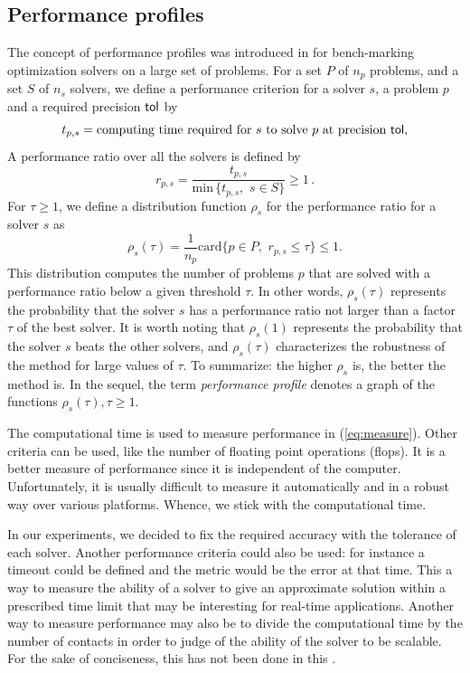 \subsection{Performance profiles}

The concept of performance profiles was introduced in \citep{Dolan.More_MP2002} for bench-marking optimization solvers on a large set of problems. For a set $P$ of $n_p$ problems, and a set $S$ of $n_s$ solvers, we define a performance criterion for a solver $s$, a problem $p$ and a required precision $\sf tol$ by
\begin{equation}
  \label{eq:measure}
 t_{p,s} = \text{computing time required for}\, \,  s\, \,  \text{to solve}\, \,  p \, \,  \text{at precision } \sf tol, 
\end{equation}
A performance ratio over all the solvers is defined by
\begin{equation}
 r_{p, s} = \frac{t_{p,s}}{\text{min}\, \{t_{p,s}, \, \, s \in S\}} \geq 1 \, .
\end{equation}
For $\tau \geq 1$, we define a  distribution function $\rho_s$ for the performance ratio for a solver $s$ as
\begin{equation}
 \rho_s(\tau) = \frac{1}{n_p} \text{card} \{p \in P, \, \, r_{p, s} \leq \tau\} \leq 1.
\end{equation}
This distribution computes the number of problems $p$ that are solved with a performance ratio below a given threshold $\tau$. In other words, $\rho_s(\tau)$ represents the probability that the solver $s$ has a performance ratio not larger than a factor $\tau$ of the best solver. It is worth noting that $\rho_s(1)$ represents the probability that the solver $s$ beats the other solvers, and $\rho_s(\tau)$ characterizes the robustness of the method for large values of $\tau$.
To summarize: the higher $\rho_s$ is, the better the method is. In the sequel, the term \emph{performance profile} denotes a graph of the functions $\rho_s(\tau), \tau \geq 1$.

The computational time is used to measure performance in (\ref{eq:measure}). 
Other criteria can be used, like the number of floating point operations (flops).
It is a better measure of performance since it is independent of the computer. Unfortunately, it is usually difficult to measure it automatically and in a robust way over various platforms.
Whence, we stick with the computational time.

In our experiments, we decided to fix the required accuracy with the tolerance of each solver.
Another performance criteria could also  be used: for instance {a timeout could be defined and the metric would be the error at that time.}
This a way to measure the ability of a solver to give an approximate solution within a prescribed   time limit that may be interesting for real-time applications. Another way to measure performance may also be to divide the computational time by the number of contacts in order to judge of the ability of the solver to be scalable. For the sake of conciseness, this has not been done in this \chapterorreport{}.


